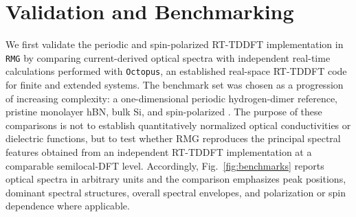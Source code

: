 
\section{Validation and Benchmarking} 
\label{sec:results}

We first validate the periodic and spin-polarized RT-TDDFT
implementation in \texttt{RMG} by comparing current-derived optical
spectra with independent real-time calculations performed with
\texttt{Octopus}, an established real-space RT-TDDFT code for finite
and extended systems.\cite{octopus-2020}  The benchmark set was chosen
as a progression of increasing complexity: a one-dimensional periodic
hydrogen-dimer reference, pristine monolayer hBN, bulk Si, and
spin-polarized .  The purpose of these comparisons is not to
establish quantitatively normalized optical conductivities or
dielectric functions, but to test whether RMG reproduces the principal
spectral features obtained from an independent RT-TDDFT implementation
at a comparable semilocal-DFT level.  Accordingly,
Fig.~\ref{fig:benchmarks} reports optical spectra in arbitrary units
and the comparison emphasizes peak positions, dominant spectral
structures, overall spectral envelopes, and polarization or spin
dependence where applicable.


